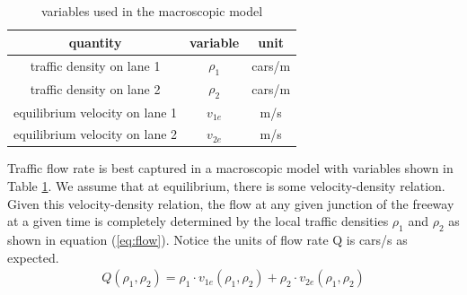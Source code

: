 \begin{table}[h]
	\begin{tabular}{|c|c|c|} \hline
	quantity & variable & unit \\ \hline
	traffic density on lane 1 & $\rho_1$ & cars/m \\ \hline
	traffic density on lane 2 & $\rho_2$ & cars/m \\ \hline
	equilibrium velocity on lane 1 & $v_{1e}$ & m/s \\ \hline
	equilibrium velocity on lane 2 & $v_{2e}$ & m/s \\ \hline
	\end{tabular}
	\caption{ variables used in the macroscopic model \label{tab:variables} }
	\end{table}	 
	
	Traffic flow rate is best captured in a macroscopic model with variables shown in Table \ref{tab:variables}. We assume that at equilibrium, there is some velocity-density relation. Given this velocity-density relation, the flow at any given junction of the freeway at a given time is completely determined by the local traffic densities $\rho_1$ and $\rho_2$ as shown in equation (\ref{eq:flow}). Notice the units of flow rate Q is cars/s as expected.
	\begin{align}
	& Q(\rho_1,\rho_2) = \rho_1\cdot v_{1e}(\rho_1,\rho_2)+\rho_2\cdot v_{2e}(\rho_1,\rho_2) & \label{eq:flow}
	\end{align}

	
